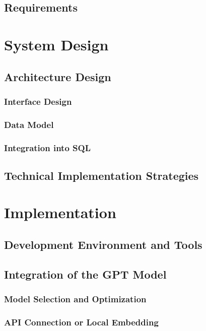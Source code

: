 \documentclass{article}
\begin{document}
\subsection{Requirements}

\section{System Design}

\subsection{Architecture Design}
\subsubsection{Interface Design}
\subsubsection{Data Model}
\subsubsection{Integration into SQL}

\subsection{Technical Implementation Strategies}

\newpage

\section{Implementation}

\subsection{Development Environment and Tools}

\subsection{Integration of the GPT Model}
\subsubsection{Model Selection and Optimization}
\subsubsection{API Connection or Local Embedding}
\end{document}
